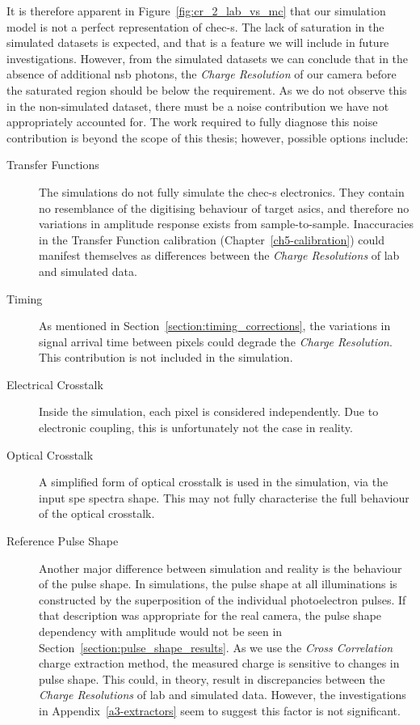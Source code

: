 It is therefore apparent in Figure~\ref{fig:cr_2_lab_vs_mc} that our simulation model is not a perfect representation of \gls{chec-s}. The lack of saturation in the simulated datasets is expected, and that is a feature we will include in future investigations. However, from the simulated datasets we can conclude that in the absence of additional \gls{nsb} photons, the \textit{Charge Resolution} of our camera before the saturated region should be below the requirement. As we do not observe this in the non-simulated dataset, there must be a noise contribution we have not appropriately accounted for. The work required to fully diagnose this noise contribution is beyond the scope of this thesis; however, possible options include:
\begin{description}
\item [Transfer Functions] The simulations do not fully simulate the \gls{chec-s} electronics. They contain no resemblance of the digitising behaviour of \gls{target} \glspl{asic}, and therefore no variations in amplitude response exists from sample-to-sample. Inaccuracies in the Transfer Function calibration (Chapter~\ref{ch5-calibration}) could manifest themselves as differences between the \textit{Charge Resolutions} of lab and simulated data.
\item [Timing] As mentioned in Section~\ref{section:timing_corrections}, the variations in signal arrival time between pixels could degrade the \textit{Charge Resolution}. This contribution is not included in the simulation.
\item [Electrical Crosstalk] Inside the simulation, each pixel is considered independently. Due to electronic coupling, this is unfortunately not the case in reality. 
\item [Optical Crosstalk] A simplified form of optical crosstalk is used in the simulation, via the input \gls{spe} spectra shape. This may not fully characterise the full behaviour of the optical crosstalk.
\item [Reference Pulse Shape] Another major difference between simulation and reality is the behaviour of the pulse shape. In simulations, the pulse shape at all illuminations is constructed by the superposition of the individual photoelectron pulses. If that description was appropriate for the real camera, the pulse shape dependency with amplitude would not be seen in Section~\ref{section:pulse_shape_results}. As we use the \textit{Cross Correlation} charge extraction method, the measured charge is sensitive to changes in pulse shape. This could, in theory, result in discrepancies between the \textit{Charge Resolutions} of lab and simulated data. However, the investigations in Appendix~\ref{a3-extractors} seem to suggest this factor is not significant.
\end{description}

